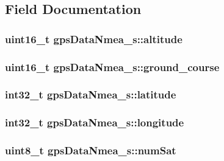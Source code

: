 \subsection{Field Documentation}
\hypertarget{structgpsDataNmea__s_aeb366fa2b20d3df0817a5f84a9ed9a91}{
\subsubsection[{altitude}]{\setlength{\rightskip}{0pt plus 5cm}uint16\+\_\+t gps\+Data\+Nmea\+\_\+s\+::altitude}}\label{structgpsDataNmea__s_aeb366fa2b20d3df0817a5f84a9ed9a91}
\hypertarget{structgpsDataNmea__s_a3f85ec0e7e8d6b71427236b2c33d2931}{
\subsubsection[{ground\+\_\+course}]{\setlength{\rightskip}{0pt plus 5cm}uint16\+\_\+t gps\+Data\+Nmea\+\_\+s\+::ground\+\_\+course}}\label{structgpsDataNmea__s_a3f85ec0e7e8d6b71427236b2c33d2931}
\hypertarget{structgpsDataNmea__s_ac2596fd3d15e2d164a0282f4185e7b85}{
\subsubsection[{latitude}]{\setlength{\rightskip}{0pt plus 5cm}int32\+\_\+t gps\+Data\+Nmea\+\_\+s\+::latitude}}\label{structgpsDataNmea__s_ac2596fd3d15e2d164a0282f4185e7b85}
\hypertarget{structgpsDataNmea__s_a5882f2a75b00995fd5653402b8c0584a}{
\subsubsection[{longitude}]{\setlength{\rightskip}{0pt plus 5cm}int32\+\_\+t gps\+Data\+Nmea\+\_\+s\+::longitude}}\label{structgpsDataNmea__s_a5882f2a75b00995fd5653402b8c0584a}
\hypertarget{structgpsDataNmea__s_a9ac8b69516d7ddbf1e3679552e6d54cc}{
\subsubsection[{num\+Sat}]{\setlength{\rightskip}{0pt plus 5cm}uint8\+\_\+t gps\+Data\+Nmea\+\_\+s\+::num\+Sat}}\label{structgpsDataNmea__s_a9ac8b69516d7ddbf1e3679552e6d54cc}
